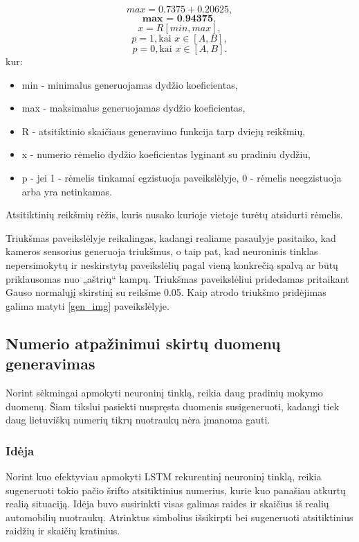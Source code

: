 \documentclass{VUMIFInfBakalaurinis}
\begin{document}
\begin{equation}
  max = 0.7375 + 0.20625,
\end{equation}
\begin{equation}
  \textbf{max = 0.94375},
\end{equation}
\begin{equation}
  x = R[min, max],
\end{equation}
\begin{equation}
  p = 1, \text{kai } x \in [A, B],
\end{equation}
\begin{equation}
  p = 0, \text{kai } x \in [A, B].
\end{equation}
kur:
\begin{itemize}[itemsep=0.5pt]
  \item min - minimalus generuojamas dydžio koeficientas,
  \item max - maksimalus generuojamas dydžio koeficientas,
  \item R - atsitiktinio skaičiaus generavimo funkcija tarp dviejų reikšmių,
  \item x - numerio rėmelio dydžio koeficientas lyginant su pradiniu dydžiu,
  \item p - jei 1 - rėmelis tinkamai egzistuoja paveikslėlyje, 0 - rėmelis neegzistuoja arba yra netinkamas.
\end{itemize}

Atsitiktinių reikšmių rėžis, kuris nusako kurioje vietoje turėtų atsidurti rėmelis.

Triukšmas paveikslėlyje reikalingas, kadangi realiame pasaulyje pasitaiko, kad kameros sensorius generuoja triukšmus, o taip pat,
kad neuroninis tinklas nepersimokytų ir neskirstytų paveikslėlių pagal vieną konkrečią spalvą ar būtų priklausomas nuo „aštrių“ kampų.
Triukšmas paveikslėliui pridedamas pritaikant Gauso normalųjį skirstinį su reikšme 0.05.
Kaip atrodo triukšmo pridėjimas galima matyti \ref{gen_img} paveikslėlyje.

\subsection{Numerio atpažinimui skirtų duomenų generavimas}
Norint sėkmingai apmokyti neuroninį tinklą, reikia daug pradinių mokymo duomenų. Šiam tikslui pasiekti nuspręsta duomenis susigeneruoti, kadangi tiek daug lietuviškų numerių
tikrų nuotraukų nėra įmanoma gauti. 

\subsubsection{Idėja}
Norint kuo efektyviau apmokyti LSTM rekurentinį neuroninį tinklą, reikia sugeneruoti tokio pačio šrifto atsitiktinius numerius, kurie kuo panašiau atkurtų realią situaciją. 
Idėja buvo susirinkti visas galimas raides ir skaičius iš realių automobilių nuotraukų. Atrinktus simbolius išsikirpti bei sugeneruoti atsitiktinius raidžių ir skaičių kratinius.
\end{document}
